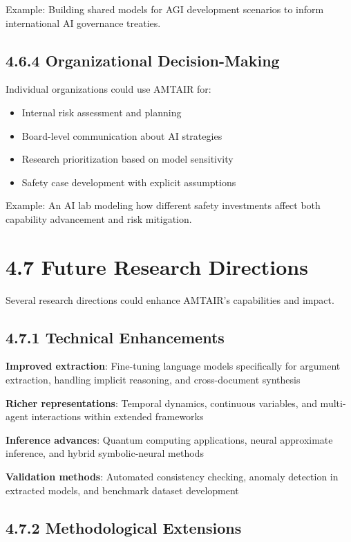 \documentclass[
  11pt,
  letterpaper,
  openany]{book}
\providecommand{\tightlist}{%
  \setlength{\itemsep}{0pt}\setlength{\parskip}{0pt}}
\begin{document}
Example: Building shared models for AGI development scenarios to inform
international AI governance treaties.

\subsection{4.6.4 Organizational
Decision-Making}\label{sec-organizational-integration}

Individual organizations could use AMTAIR for:

\begin{itemize}
\tightlist
\item
  Internal risk assessment and planning
\item
  Board-level communication about AI strategies
\item
  Research prioritization based on model sensitivity
\item
  Safety case development with explicit assumptions
\end{itemize}

Example: An AI lab modeling how different safety investments affect both
capability advancement and risk mitigation.

\section{4.7 Future Research Directions}\label{sec-future-research}

Several research directions could enhance AMTAIR's capabilities and
impact.

\subsection{4.7.1 Technical Enhancements}\label{sec-technical-future}

\textbf{Improved extraction}: Fine-tuning language models specifically
for argument extraction, handling implicit reasoning, and cross-document
synthesis

\textbf{Richer representations}: Temporal dynamics, continuous
variables, and multi-agent interactions within extended frameworks

\textbf{Inference advances}: Quantum computing applications, neural
approximate inference, and hybrid symbolic-neural methods

\textbf{Validation methods}: Automated consistency checking, anomaly
detection in extracted models, and benchmark dataset development

\subsection{4.7.2 Methodological
Extensions}\label{sec-methodological-future}
\end{document}
